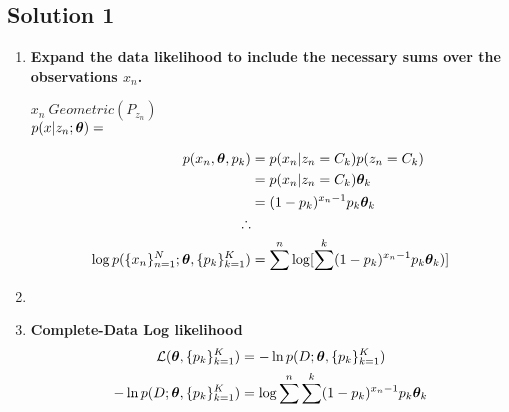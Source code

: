 \documentclass[submit]{harvardml}
\begin{document}
\subsection*{Solution 1}

\begin{enumerate}
    \item \textbf{Expand the data likelihood to include the necessary sums over the observations $x_n$.}
    
    $x_n ~ Geometric(P_{z_n})$\\
    $p(x| z_n; \boldsymbol{\theta}) = $
    
    
    \begin{align*}
        p(x_n, \boldsymbol{\theta}, p_k) &= p(x_n | z_n = C_k) p(z_n = C_k) \\
        &= p(x_n | z_n = C_k) \boldsymbol{\theta}_k \\
        &= (1 - p_k)^{x_n - 1} p_k \boldsymbol{\theta}_k \\
        \therefore \\
        \log p(\{x_n\}^N_{n=1}; \boldsymbol{\theta}, \{p_k\}^K_{k = 1}) &=  \sum^n  \log [ \sum^k (1 - p_k)^{x_n - 1} p_k \boldsymbol{\theta}_k)]
    \end{align*}
    
    \item 
    \item \textbf{Complete-Data Log likelihood}
    \begin{align*}
        \mathcal{L}(\boldsymbol{\theta}, \{p_k\}^K_{k=1}) &=  -\ln p(D; \boldsymbol{\theta}, \{p_k\}^K_{k=1}) \\
        -\ln p(D; \boldsymbol{\theta}, \{p_k\}^K_{k=1}) &= \log \sum^n \sum^k (1 - p_k)^{x_n - 1} p_k \boldsymbol{\theta}_k
    \end{align*}
\end{enumerate}
\end{document}

